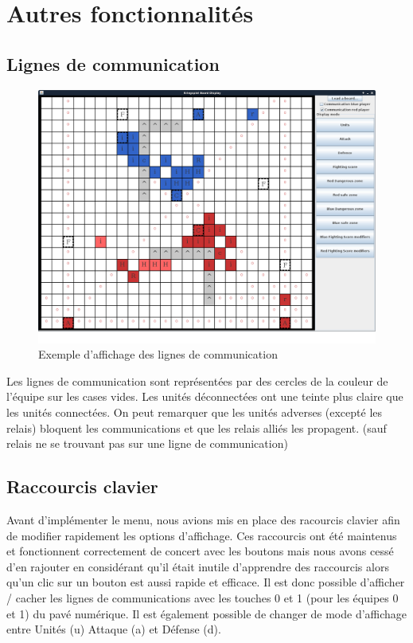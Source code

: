	\section{Autres fonctionnalités}

		\subsection{Lignes de communication}

			\begin{figure}[!h]
			\centerline{\includegraphics[scale=0.35]{images/screen_com.png}}
			\caption{Exemple d'affichage des lignes de communication}
			\end{figure}
			Les lignes de communication sont représentées par des cercles de la couleur de l'équipe sur les cases vides.
			Les unités déconnectées ont une teinte plus claire que les unités connectées.
			On peut remarquer que les unités adverses (excepté les relais) bloquent les communications et que les relais alliés les propagent. 
			(sauf relais ne se trouvant pas sur une ligne de communication)
			
			\clearpage

		\subsection{Raccourcis clavier}
			Avant d'implémenter le menu, nous avions mis en place des racourcis clavier afin de modifier rapidement les options d'affichage.
			Ces raccourcis ont été maintenus et fonctionnent correctement de concert avec les boutons mais nous avons cessé d'en rajouter 
			en considérant qu'il était inutile d'apprendre des raccourcis alors qu'un clic sur un bouton est aussi rapide et efficace.
			Il est donc possible d'afficher / cacher les lignes de communications avec les touches 0 et 1 (pour les équipes 0 et 1) du pavé numérique.
			Il est également possible de changer de mode d'affichage entre Unités (u) Attaque (a) et Défense (d).
